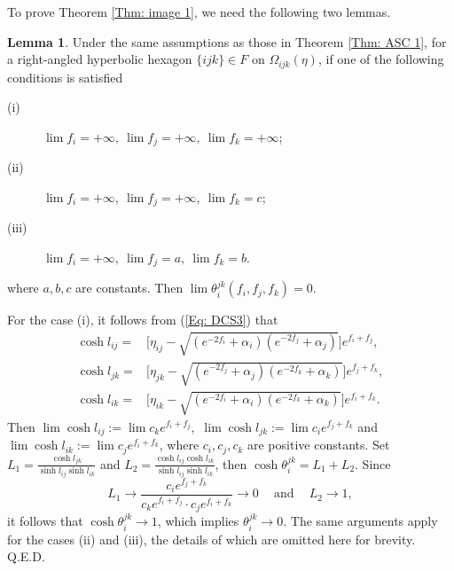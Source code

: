 \documentclass[12pt]{amsart}
\theoremstyle{definition}
\newtheorem{lemma}[theorem]{Lemma}
\def\qed{\hfill{Q.E.D.}\smallskip}
\begin{document}
To prove Theorem \ref{Thm: image 1}, we need the following two lemmas.

\begin{lemma}\label{Lem: limit a1}
Under the same assumptions as those in Theorem \ref{Thm: ASC 1},
for a right-angled hyperbolic hexagon $\{ijk\}\in F$ on $\Omega_{ijk}(\eta)$,
if one of the following conditions is satisfied
\begin{description}
\item[(i)] $\lim f_i=+\infty,\ \lim f_j=+\infty,\ \lim f_k=+\infty$;
\item[(ii)] $\lim f_i=+\infty,\ \lim f_j=+\infty,\ \lim f_k=c$;
\item[(iii)] $\lim f_i=+\infty,\ \lim f_j=a,\ \lim f_k=b$.
\end{description}
where $a, b,c$ are constants.
Then $\lim\theta^{jk}_i(f_i,f_j,f_k)=0$.
\end{lemma}
\proof
For the case (i), it follows from (\ref{Eq: DCS3}) that
\begin{equation}\label{Eq: F57}
\begin{aligned}
\cosh l_{ij}=&\bigg[\eta_{ij}-\sqrt{(e^{-2f_i}+\alpha_i)
(e^{-2f_j}+\alpha_j)}\bigg]e^{f_i+f_j},\\
\cosh l_{jk}=&\bigg[\eta_{jk}-\sqrt{(e^{-2f_j}+\alpha_j)
(e^{-2f_k}+\alpha_k)}\bigg]e^{f_j+f_k},\\
\cosh l_{ik}=&\bigg[\eta_{ik}-\sqrt{(e^{-2f_i}+\alpha_i)
(e^{-2f_k}+\alpha_k)}\bigg]e^{f_i+f_k}.
\end{aligned}
\end{equation}
Then $\lim\cosh l_{ij}:=\lim c_ke^{f_i+f_j}$,\ $\lim\cosh l_{jk}:=\lim c_ie^{f_j+f_k}$ and $\lim\cosh l_{ik}:=\lim c_je^{f_i+f_k}$,
where $c_i, c_j, c_k$ are positive constants.
Set $L_1=\frac{\cosh l_{jk}}{\sinh l_{ij}\sinh l_{ik}}$ and $L_2=\frac{\cosh l_{ij}\cosh l_{ik}}{\sinh l_{ij}\sinh l_{ik}}$,
then $\cosh \theta^{jk}_i=L_1+L_2$.
Since
\begin{equation*}
L_1\rightarrow
\frac{c_ie^{f_j+f_k}}{c_ke^{f_i+f_j}\cdot c_je^{f_i+f_k}}
\rightarrow 0 \quad \ \text{and}\ \quad
L_2\rightarrow 1,
\end{equation*}
it follows that $\cosh \theta^{jk}_i\rightarrow 1$, which implies $\theta_i^{jk}\rightarrow 0$.
The same arguments apply for the cases (ii) and (iii), the details of which are omitted here for brevity.
\qed
\end{document}
